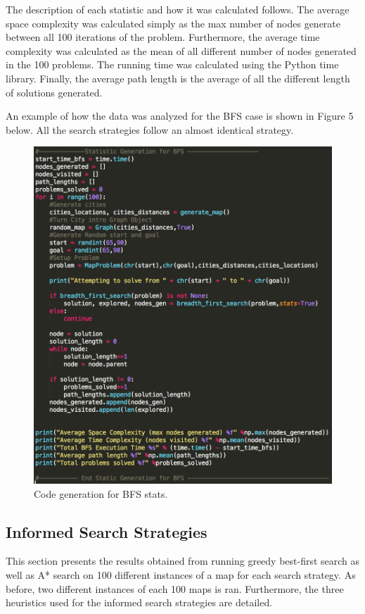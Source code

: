 \documentclass[12pt, letter]{article}
\begin{document}
\FloatBarrier

The description of each statistic and how it was calculated follows. The average space complexity was calculated simply as the max number of nodes generate between all 100 iterations of the problem. Furthermore, the average time complexity was calculated as the mean of all different number of nodes generated in the 100 problems. The running time was calculated using the Python time library. Finally, the average path length is the average of all the different length of solutions generated. 

An example of how the data was analyzed for the BFS case is shown in Figure 5 below. All the search strategies follow an almost identical strategy. 

\begin{figure}[htb]
  \centering
  \includegraphics[width=0.9 \textwidth]{./graphs/bfs_stats.png}
  \caption{Code generation for BFS stats.}
\end{figure}

\FloatBarrier

\subsection{Informed Search Strategies}

This section presents the results obtained from running greedy best-first search as well as A* search on 100 different instances of a map for each search strategy. As before, two different instances of each 100 maps is ran. Furthermore, the three heuristics used for the informed search strategies are detailed.
\end{document}
